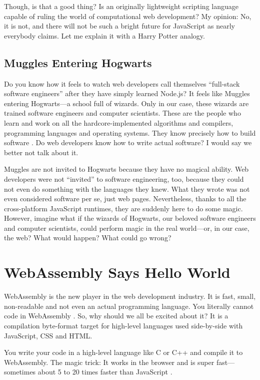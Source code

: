 \documentclass[10pt]{article}
\begin{document}
\begin{sloppypar}
  Though, is that a good thing? Is an originally lightweight scripting language capable of ruling the world of computational web development? My opinion: No, it is not, and there will not be such a bright future for JavaScript as nearly everybody claims. Let me explain it with a Harry Potter analogy.

  \subsection{Muggles Entering Hogwarts}
  \label{sec:muggles}

  Do you know how it feels to watch web developers call themselves “full-stack software engineers” after they have simply learned Node.js? It feels like Muggles entering Hogwarts—a school full of wizards. Only in our case, these wizards are trained software engineers and computer scientists. These are the people who learn and work on all the hardcore-implemented algorithms and compilers, programming languages and operating systems. They know precisely how to build software \citep{might_what_2011}. Do web developers know how to write actual software? I would say we better not talk about it.

  Muggles are not invited to Hogwarts because they have no magical ability. Web developers were not “invited” to software engineering, too, because they could not even do something with the languages they knew. What they wrote was not even considered software per se, just web pages. Nevertheless, thanks to all the cross-platform JavaScript runtimes, they are suddenly here to do some magic. However, imagine what if the wizards of Hogwarts, our beloved software engineers and computer scientists, could perform magic in the real world—or, in our case, the web? What would happen? What could go wrong?

  \section{WebAssembly Says Hello World}
  \label{sec:hello-world}

  WebAssembly is the new player in the web development industry. It is fast, small, non-readable and not even an actual programming language. You literally cannot code in WebAssembly \citep{rourke_learn_2018}. So, why should we all be excited about it? It is a compilation byte-format target for high-level languages used side-by-side with JavaScript, CSS and HTML.

  You write your code in a high-level language like C or C++ and compile it to WebAssembly. The magic trick: It works in the browser and is super fast—sometimes about 5 to 20 times faster than JavaScript \citep{aboukhalil_how_2019}.


\end{sloppypar}
\end{document}

